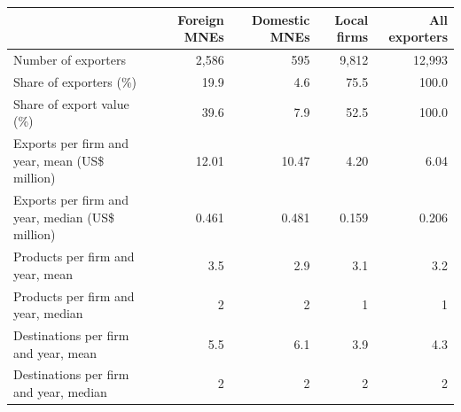 \begin{tabular}{lrrrr}
\toprule
 & Foreign MNEs & Domestic MNEs & Local firms & All exporters \\
\midrule
Number of exporters & 2,586 & 595 & 9,812 & 12,993 \\
Share of exporters (\%) & 19.9 & 4.6 & 75.5 & 100.0 \\
Share of export value (\%) & 39.6 & 7.9 & 52.5 & 100.0 \\
Exports per firm and year, mean (US\$ million) & 12.01 & 10.47 & 4.20 & 6.04 \\
Exports per firm and year, median (US\$ million) & 0.461 & 0.481 & 0.159 & 0.206 \\
Products per firm and year, mean & 3.5 & 2.9 & 3.1 & 3.2 \\
Products per firm and year, median & 2 & 2 & 1 & 1 \\
Destinations per firm and year, mean & 5.5 & 6.1 & 3.9 & 4.3 \\
Destinations per firm and year, median & 2 & 2 & 2 & 2 \\
\bottomrule
\end{tabular}
